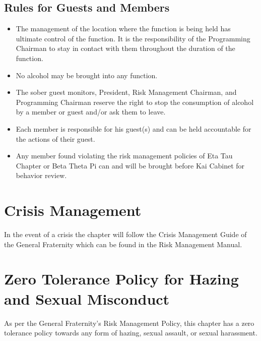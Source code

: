 \subsection{Rules for Guests and Members}
\begin{itemize}
    \item The management of the location where the function is being held has
        ultimate control of the function.  It is the responsibility of the
        Programming Chairman to stay in contact with them throughout the
        duration of the function.
    \item No alcohol may be brought into any function.
    \item The sober guest monitors, President, Risk Management Chairman, and
        Programming Chairman reserve the right to stop the consumption of
        alcohol by a member or guest and/or ask them to leave.
    \item Each member is responsible for his guest(s) and can be held
        accountable for the actions of their guest.
    \item Any member found violating the risk management policies of Eta Tau
        Chapter or Beta Theta Pi can and will be brought before Kai Cabinet for
        behavior review.
\end{itemize}

\section{Crisis Management}

In the event of a crisis the chapter will follow the Crisis Management Guide of
the General Fraternity which can be found in the Risk Management Manual.

\section{Zero Tolerance Policy for Hazing and Sexual Misconduct}

As per the General Fraternity’s Risk Management Policy, this chapter has a zero
tolerance policy towards any form of hazing, sexual assault, or sexual
harassment.

